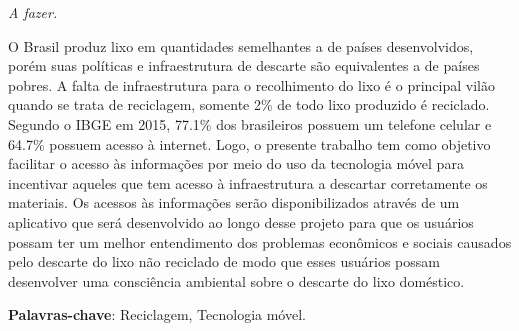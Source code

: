 \documentclass[
	12pt,				%
	openany,			%
	twoside,			%
	a4paper,			%
	english,			%
	french,				%
	spanish,			%
	brazil				%
	]{abntex2}
\begin{document}
\begin{dedicatoria}
   \vspace*{\fill}
   \centering
   \noindent
   \textit{ A fazer.} \vspace*{\fill}
\end{dedicatoria}

\begin{agradecimentos}


\end{agradecimentos}





\setlength{\absparsep}{18pt} %
\begin{resumo}

 O Brasil produz lixo em quantidades semelhantes a de países desenvolvidos, porém suas políticas e infraestrutura de descarte são equivalentes a de países pobres. A falta de infraestrutura para o recolhimento do lixo é o principal vilão quando se trata de reciclagem, somente 2\% de todo lixo produzido é reciclado.
	Segundo o IBGE em 2015, 77.1\% dos brasileiros possuem um telefone celular e 64.7\% possuem acesso à internet. Logo, o presente trabalho tem como objetivo facilitar o acesso às informações por meio do uso da tecnologia móvel para incentivar aqueles que tem acesso à infraestrutura a descartar corretamente os materiais. Os acessos às informações serão disponibilizados através de um aplicativo que será desenvolvido ao longo desse projeto para que os usuários possam ter um melhor entendimento dos problemas econômicos e sociais causados pelo descarte do lixo não reciclado de modo que esses usuários possam desenvolver uma consciência ambiental sobre o descarte do lixo doméstico.


 \textbf{Palavras-chave}: Reciclagem, Tecnologia móvel.
\end{resumo}
\end{document}
